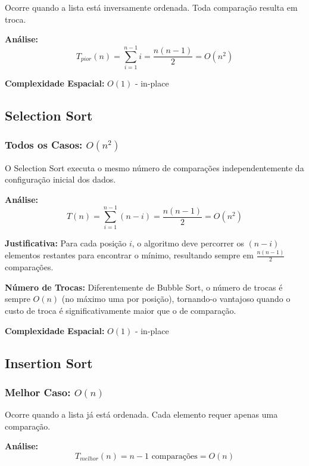 \documentclass[conference]{IEEEtran}
\begin{document}
Ocorre quando a lista está inversamente ordenada. Toda comparação resulta em troca.

\textbf{Análise:}
\begin{equation}
T_{pior}(n) = \sum_{i=1}^{n-1} i = \frac{n(n-1)}{2} = O(n^2)
\end{equation}

\textbf{Complexidade Espacial:} $O(1)$ - in-place

\subsection{Selection Sort}

\subsubsection{Todos os Casos: $O(n^2)$}

O Selection Sort executa o mesmo número de comparações independentemente da configuração inicial dos dados.

\textbf{Análise:}
\begin{equation}
T(n) = \sum_{i=1}^{n-1} (n-i) = \frac{n(n-1)}{2} = O(n^2)
\end{equation}

\textbf{Justificativa:}
Para cada posição $i$, o algoritmo deve percorrer os $(n-i)$ elementos restantes para encontrar o mínimo, resultando sempre em $\frac{n(n-1)}{2}$ comparações.

\textbf{Número de Trocas:}
Diferentemente de Bubble Sort, o número de trocas é sempre $O(n)$ (no máximo uma por posição), tornando-o vantajoso quando o custo de troca é significativamente maior que o de comparação.

\textbf{Complexidade Espacial:} $O(1)$ - in-place

\subsection{Insertion Sort}

\subsubsection{Melhor Caso: $O(n)$}

Ocorre quando a lista já está ordenada. Cada elemento requer apenas uma comparação.

\textbf{Análise:}
\begin{equation}
T_{melhor}(n) = n - 1 \text{ comparações} = O(n)
\end{equation}
\end{document}
